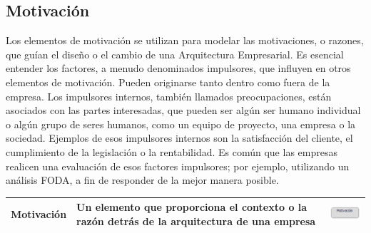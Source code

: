 \newpage
\subsection{Motivación}

Los elementos de motivación se utilizan para modelar las motivaciones, o razones, que guían el diseño o el cambio de una Arquitectura Empresarial. Es esencial entender los factores, a menudo denominados impulsores, que influyen en otros elementos de motivación.  Pueden originarse tanto dentro como fuera de la empresa.  Los impulsores internos, también llamados preocupaciones, están asociados con las partes interesadas, que pueden ser algún ser humano individual o algún grupo de seres humanos, como un equipo de proyecto, una empresa o la sociedad. Ejemplos de esos impulsores internos son la satisfacción del cliente, el cumplimiento de la legislación o la rentabilidad. Es común que las empresas realicen una evaluación de esos factores impulsores; por ejemplo, utilizando un análisis FODA, a fin de responder de la mejor manera posible.

\begin{center}
	\begin{tabular}{ | m{6em} | m{4cm}| m{2cm} | } 
		\hline
		Motivación& Un elemento que proporciona el contexto o la razón detrás de la arquitectura de una empresa & \includegraphics[width=0.8\linewidth, height=0.05\textheight]{imgs/Elementos/Motivacion.PNG}
		\\ 
		\hline
	\end{tabular}
\end{center}

\newpage
